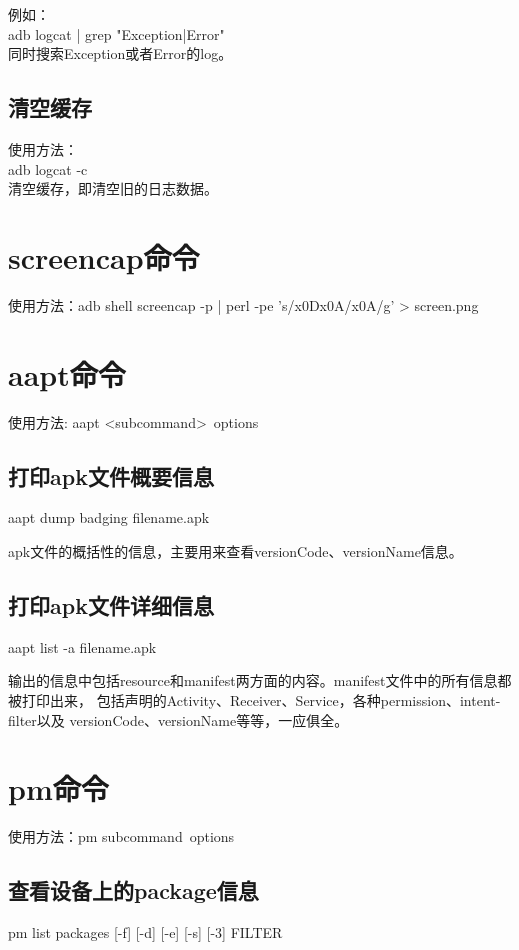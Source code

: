 ﻿\documentclass[a4paper,11pt]{article}
\begin{document}
  例如：\\
  adb logcat | grep "Exception\bs|Error"\\
  同时搜索Exception或者Error的log。

  \subsection[clear buffer]{清空缓存}
  使用方法：\\
  adb logcat -c\\
  清空缓存，即清空旧的日志数据。

  \section[screencap]{screencap命令}
  使用方法：adb shell screencap -p | perl -pe 's/\bs x0D\bs x0A/\bs x0A/g' > screen.png
  
  \section[aapt - Android Asset Packaging Tool]{aapt命令}
  使用方法: aapt \textless subcommand\textgreater\ \lt options\gt
  \subsection[print apk file badging information]{打印apk文件概要信息}
  aapt dump badging filename.apk

  apk文件的概括性的信息，主要用来查看versionCode、versionName信息。

  \subsection[print apk file verbose information]{打印apk文件详细信息}
  aapt list -a filename.apk

  输出的信息中包括resource和manifest两方面的内容。manifest文件中的所有信息都被打印出来，
  包括声明的Activity、Receiver、Service，各种permission、intent-filter以及
  versionCode、versionName等等，一应俱全。

  \section[pm - Package Manager]{pm命令}
  使用方法：pm \lt subcommand\gt\ \lt options\gt

  \subsection[list packages]{查看设备上的package信息}
  pm list packages [-f] [-d] [-e] [-s] [-3] FILTER
\end{document}
